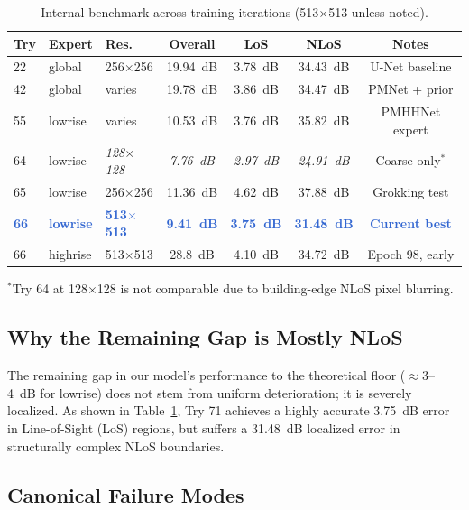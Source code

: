 \documentclass[11pt,a4paper]{article}
\newcommand{\ours}[1]{\textcolor{highlight}{\textbf{#1}}}
\begin{document}
\begin{table}[h!]
\centering
\caption{Internal benchmark across training iterations (513$\times$513 unless noted).}
\label{tab:progress}
\begin{center}
    

\begin{tabular}{lllcccc}
\toprule
\textbf{Try} & \textbf{Expert} & \textbf{Res.} & \textbf{Overall} & \textbf{LoS} & \textbf{NLoS} & \textbf{Notes} \\
\midrule
22 & global & 256$\times$256 & 19.94~dB & 3.78~dB & 34.43~dB & U-Net baseline \\
42 & global & varies & 19.78~dB & 3.86~dB & 34.47~dB & PMNet + prior \\
55 & lowrise & varies & 10.53~dB & 3.76~dB & 35.82~dB & PMHHNet expert \\
64 & lowrise & \textit{128$\times$128} & \textit{7.76~dB} & \textit{2.97~dB} & \textit{24.91~dB} & Coarse-only$^*$ \\
65 & lowrise & 256$\times$256 & 11.36~dB & 4.62~dB & 37.88~dB & Grokking test \\
\midrule
\ours{66} & \ours{lowrise} & \ours{513$\times$513} & \ours{9.41~dB} & \ours{3.75~dB} & \ours{31.48~dB} & \ours{Current best} \\
66 & highrise & 513$\times$513 & 28.8~dB & 4.10~dB & 34.72~dB & Epoch 98, early \\
\bottomrule
\end{tabular}
\end{center}
\end{table}
\footnotesize $^*$Try 64 at 128$\times$128 is not comparable due to building-edge NLoS pixel blurring.
\normalsize
\subsection{Why the Remaining Gap is Mostly NLoS}

The remaining gap in our model's performance to the theoretical floor ($\approx$3--4~dB for lowrise) does not stem from uniform deterioration; it is severely localized. As shown in Table~\ref{tab:progress}, Try 71 achieves a highly accurate 3.75~dB error in Line-of-Sight (LoS) regions, but suffers a 31.48~dB localized error in structurally complex NLoS boundaries. 

\subsection{Canonical Failure Modes}
\end{document}

